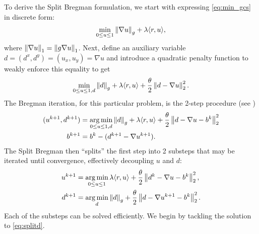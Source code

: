 To derive the Split Bregman formulation, we start with expressing \eqref{eq:min_gcs} in discrete form: 
\begin{align*}
\min_{0\leq u \leq 1} \left\lVert \nabla u \right\rVert_g + \lambda \langle r, u \rangle,
\end{align*}
where $\left\lVert \nabla u \right\rVert_1 = \left\lVert g \nabla u\right\rVert_1$. Next, 
define an auxiliary variable $d = (d^x, d^y) = (u_x, u_y) = \nabla u$ and introduce a quadratic penalty function to weakly enforce this equality to get
\begin{align*}
\min_{0\leq u \leq 1, d} 
 \left\lVert d \right\rVert_g + \lambda  \langle r, u \rangle
+ \frac{\theta}{2} \left\lVert d - \nabla u \right\rVert_2^2.
\end{align*} 
The Bregman iteration, for this particular problem, is the 2-step procedure (see \cite[Theorem 2.2.]{goldstein2009split})
\begin{align}
(u^{k+1}, d^{k+1}) 
&= \operatorname*{arg\,min}_{0\leq u \leq 1, d}  \left\lVert d\right\rVert_g + \lambda\langle r, u \rangle + \frac{\theta}{2} \left\lVert d - \nabla u - b^k \right\rVert^2_2 
\\
b^{k+1} &= b^k - (d^{k+1} - \nabla u^{k+1}) .
\label{eq:sbbij}
\end{align} 
The Split Bregman then ``splits'' the first step into 2 substeps that may be iterated until convergence, effectively decoupling $u$ and $d$: 
\begin{align}
u^{k+1} &= \operatorname*{arg\,min}_{0\leq u \leq 1} \lambda \langle r, u \rangle
+ \frac{\theta}{2} \left\lVert d^k - \nabla u - b^k \right\rVert^2_2,
\label{eq:splitu}
\\
d^{k+1} 
&= \operatorname*{arg\,min}_d \left\lVert d\right\rVert_g + \frac{\theta}{2} \left\lVert d - \nabla u^{k+1} - b^k\right\rVert^2_2.
\label{eq:splitd}
\end{align}
Each of the substeps can be solved efficiently. We begin by tackling the solution to \eqref{eq:splitd}.

